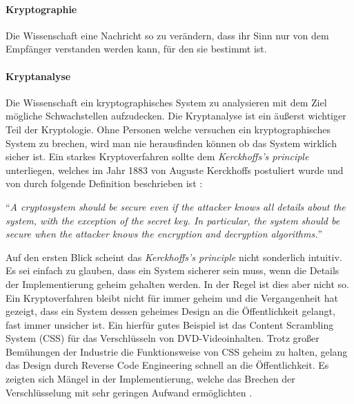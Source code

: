 \paragraph{Kryptographie}
Die Wissenschaft eine Nachricht so zu verändern, dass ihr Sinn nur von dem Empfänger
verstanden werden kann, für den sie bestimmt ist.

\paragraph{Kryptanalyse}
Die Wissenschaft ein kryptographisches System zu analysieren mit dem Ziel mögliche
Schwachstellen aufzudecken. Die Kryptanalyse ist ein äußerst wichtiger Teil der
Kryptologie. Ohne Personen welche versuchen ein kryptographisches System zu
brechen, wird man nie herausfinden können ob das System wirklich sicher ist.
Ein starkes Kryptoverfahren sollte dem \textit{Kerckhoffs's principle} unterliegen, welches
im Jahr 1883 von Auguste Kerckhoffs postuliert wurde und von \citeauthor{BOOK:crypto}
durch folgende Definition beschrieben ist \parencite*[11]{BOOK:crypto}:

\begin{definition}
  \enquote{\textit{A cryptosystem should be secure even if the attacker knows all details about
      the system, with the exception of the secret key. In particular, the system should be secure when
      the attacker knows the encryption and decryption algorithms.}}
\end{definition}

\noindent
Auf den ersten Blick scheint das \textit{Kerckhoffs's principle} nicht sonderlich intuitiv.
Es sei einfach zu glauben, dass ein System
sicherer sein muss, wenn die Details der Implementierung geheim gehalten werden.
In der Regel ist dies aber nicht so. Ein Kryptoverfahren bleibt nicht für immer geheim und die
Vergangenheit hat gezeigt, dass ein System dessen geheimes Design an die Öffentlichkeit
gelangt, fast immer unsicher ist. Ein hierfür gutes Beispiel ist das Content Scrambling System (CSS)
für das Verschlüsseln von DVD-Videoinhalten. Trotz großer Bemühungen der Industrie die
Funktionsweise von CSS geheim zu halten, gelang das Design durch Reverse Code Engineering
schnell an die Öffentlichkeit. Es zeigten sich Mängel in der Implementierung,
welche das Brechen der Verschlüsselung mit sehr geringen Aufwand ermöglichten \parencite{SITE:CSS}.

